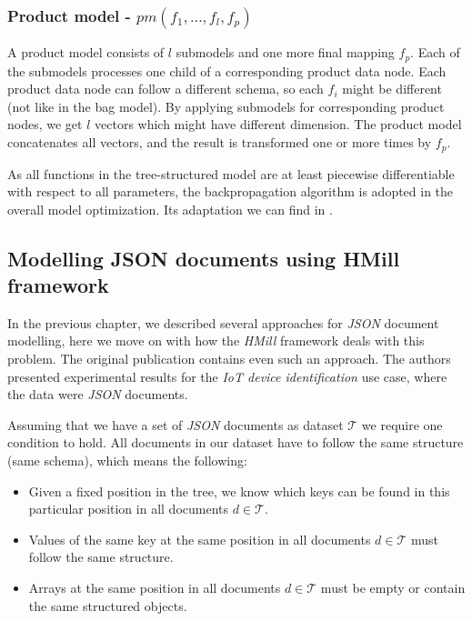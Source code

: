 \subsubsection{Product model - $pm(f_1,\dots,f_l,f_p)$}
A product model consists of $l$ submodels and one more final mapping $f_p$. Each of the submodels processes one child of a corresponding product data node. Each product data node can follow a different schema, so each $f_i$ might be different (not like in the bag model). By applying submodels for corresponding product nodes, we get $l$ vectors which might have different dimension. The product model concatenates all vectors, and the result is transformed one or more times by $f_p$.

As all functions in the tree-structured model are at least piecewise differentiable with respect to all parameters, the backpropagation algorithm is adopted in the overall model optimization. Its adaptation we can find in \cite{Mandlik2020}.



\subsection{Modelling JSON documents using HMill framework}
In the previous chapter, we described several approaches for \emph{JSON} document modelling, here we move on with how the \emph{HMill} framework deals with this problem. The original publication \cite{Mandlik2020} contains even such an approach. The authors presented experimental results for the \emph{IoT device identification} use case, where the data were \emph{JSON} documents.

Assuming that we have a set of \emph{JSON} documents as dataset $\mathcal{T}$ we require one condition to hold. All documents in our dataset have to follow the same structure (same schema), which means the following:
\begin{itemize}
    \itemsep0em 
    \item Given a fixed position in the tree, we know which keys can be found in this particular position in all documents $d\in\mathcal{T}$.
    \item Values of the same key at the same position in all documents $d\in\mathcal{T}$ must follow the same structure.
    \item Arrays at the same position in all documents $d\in\mathcal{T}$ must be empty or contain the same structured objects.
\end{itemize}

